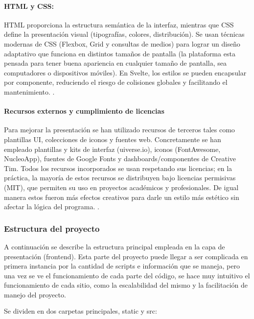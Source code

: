 \documentclass[12pt, a4paper]{article}
\begin{document}
\paragraph{HTML y CSS:}
HTML proporciona la estructura semántica de la interfaz, mientras que CSS define la presentación visual (tipografías, colores, distribución). Se usan técnicas modernas de CSS (Flexbox, Grid y consultas de medios) para lograr un diseño adaptativo que funciona en distintos tamaños de pantalla (la plataforma esta pensada para tener buena apariencia en cualquier tamaño de pantalla, sea computadores o dispositivos móviles). En Svelte, los estilos se pueden encapsular por componente, reduciendo el riesgo de colisiones globales y facilitando el mantenimiento. \cite{HTMLMDN}\cite{CSSMDN}.

\paragraph{Recursos externos y cumplimiento de licencias}
Para mejorar la presentación se han utilizado recursos de terceros tales como plantillas UI, colecciones de iconos y fuentes web. Concretamente se han empleado plantillas y kits de interfaz (uiverse.io), iconos (FontAwesome, NucleoApp), fuentes de Google Fonts y dashboards/componentes de Creative Tim. Todos los recursos incorporados se usan respetando sus licencias; en la práctica, la mayoría de estos recursos se distribuyen bajo licencias permisivas (MIT), que permiten su uso en proyectos académicos y profesionales. De igual manera estos fueron más efectos creativos para darle un estilo más estético sin afectar la lógica del programa. \cite{MITLicense}\cite{FontAwesome}\cite{GoogleFonts}\cite{CreativeTim}\cite{uiverse}.

\subsubsection{Estructura del proyecto}

A continuación se describe la estructura principal empleada en la capa de presentación (frontend). Esta parte del proyecto puede llegar a ser complicada en primera instancia por la cantidad de scripts e información que se maneja, pero una vez se ve el funcionamiento de cada parte del código, se hace muy intuitivo el funcionamiento de cada sitio, como la escalabilidad del mismo y la facilitación de manejo del proyecto.

Se dividen en dos carpetas principales, static y src:
\end{document}

